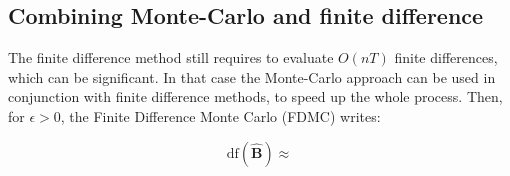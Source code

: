 \documentclass[a4paper,10pt]{article}
\theoremstyle{definition}
\begin{document}
\subsection*{Combining Monte-Carlo and finite difference}

The finite difference method still requires to evaluate $O(nT)$ finite differences, which can be significant. In that case the
Monte-Carlo approach can be used in conjunction with finite difference methods, to speed up the whole process. Then, for $\epsilon > 0$,
the Finite Difference Monte Carlo (FDMC) writes:

\begin{equation*}
    \text{df}(\hat{\mathbf{B}}) \approx
\end{equation*}


\newpage


\end{document}
